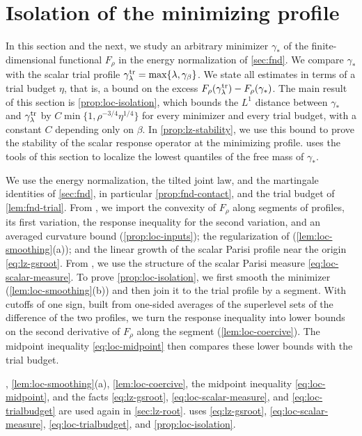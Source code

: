 \chapter{Isolation of the minimizing profile}\label{sec:lz}

In this section and the next, we study an arbitrary minimizer $\gamma_*$ of
the finite-dimensional functional $F_\rho$ in the energy normalization of
\cref{sec:fnd}. We compare $\gamma_*$ with the scalar trial profile
$\gamma^{\rm tr}_\lambda=\max\{\lambda,\gamma_\beta\}$. We state all estimates
in terms of a trial budget $\eta$, that is, a bound on the excess
$F_\rho(\gamma^{\rm tr}_\lambda)-F_\rho(\gamma_*)$. The main result of this
section is \cref{prop:loc-isolation}, which bounds the $L^1$ distance between
$\gamma_*$ and $\gamma^{\rm tr}_\lambda$ by
$C\min\{1,\rho^{-3/4}\eta^{1/4}\}$ for every minimizer and every trial budget,
with a constant $C$ depending only on $\beta$. In \cref{prop:lz-stability}, we use this bound to prove the
stability of the scalar response operator at the minimizing profile.
 uses the tools of this section to localize the lowest
quantiles of the free mass of $\gamma_*$.

We use the energy normalization, the tilted joint law, and the martingale
identities of \cref{sec:fnd}, in particular \cref{prop:fnd-contact}, and
the trial budget of \cref{lem:fnd-trial}. From \cite{AL}, we import the convexity
of $F_\rho$ along segments of profiles, its first variation, the
response inequality for the second variation, and an averaged curvature bound
(\cref{prop:loc-inputs}); the regularization of \cite[Lemma~7.5]{AL}
(\cref{lem:loc-smoothing}(a)); and the linear growth of the scalar Parisi
profile near the origin \eqref{eq:lz-gsroot}. From \cite{Lopatto}, we use the
structure of the scalar Parisi measure \eqref{eq:loc-scalar-measure}. To prove
\cref{prop:loc-isolation}, we first smooth the minimizer
(\cref{lem:loc-smoothing}(b)) and then join it to the trial profile by a
segment. With cutoffs of one sign, built from one-sided averages of the superlevel
sets of the difference of the two profiles, we turn the response inequality into
lower bounds on the second derivative of $F_\rho$ along the segment
(\cref{lem:loc-coercive}). The midpoint inequality \eqref{eq:loc-midpoint} then
compares these lower bounds with the trial budget.

, \cref{lem:loc-smoothing}(a), \cref{lem:loc-coercive},
the midpoint inequality \eqref{eq:loc-midpoint}, and the facts
\eqref{eq:lz-gsroot}, \eqref{eq:loc-scalar-measure}, and
\eqref{eq:loc-trialbudget} are used again in \cref{sec:lz-root}.
 uses \eqref{eq:lz-gsroot}, \eqref{eq:loc-scalar-measure},
\eqref{eq:loc-trialbudget}, and \cref{prop:loc-isolation}.

